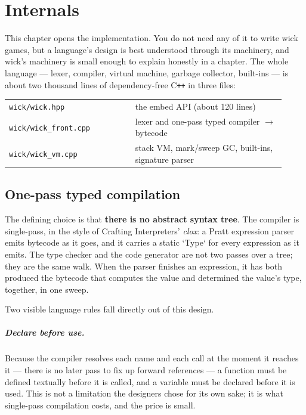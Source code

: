 \chapter{Internals}

This chapter opens the implementation. You do not need any of it to write wick
games, but a language's design is best understood through its machinery, and
wick's machinery is small enough to explain honestly in a chapter. The whole
language --- lexer, compiler, virtual machine, garbage collector, built-ins ---
is about two thousand lines of dependency-free \mbox{C\texttt{++}} in three
files:

\begin{center}
\begin{tabular}{@{}p{0.42\linewidth}p{0.50\linewidth}@{}}
\toprule
\texttt{wick/wick.hpp} & the embed API (about 120 lines) \\
\texttt{wick/wick\_front.cpp} & lexer and one-pass typed compiler $\rightarrow$ bytecode \\
\texttt{wick/wick\_vm.cpp} & stack VM, mark/sweep GC, built-ins, signature parser \\
\bottomrule
\end{tabular}
\end{center}

\section{One-pass typed compilation}

The defining choice is that \textbf{there is no abstract syntax tree}. The
compiler is single-pass, in the style of Crafting Interpreters' \emph{clox}: a
Pratt expression parser emits bytecode as it goes, and it carries a static
`Type` for every expression as it emits. The type checker and the code
generator are not two passes over a tree; they are the same walk. When the
parser finishes an expression, it has both produced the bytecode that computes
the value and determined the value's type, together, in one sweep.

Two visible language rules fall directly out of this design.

\paragraph{Declare before use.} Because the compiler resolves each name and
each call at the moment it reaches it --- there is no later pass to fix up
forward references --- a function must be defined textually before it is
called, and a variable must be declared before it is used. This is not a
limitation the designers chose for its own sake; it is what single-pass
compilation costs, and the price is small.

